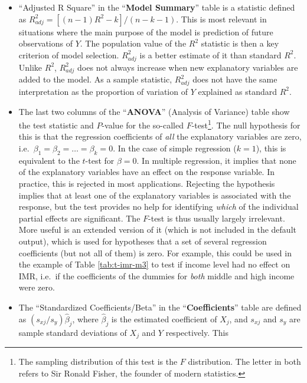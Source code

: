 \documentclass[11pt,a4paper,openany]{book}
\let\rmarkdownfootnote\footnote%
\def\footnote{\protect\rmarkdownfootnote}
\begin{document}
\begin{itemize}
\item
  ``Adjusted R Square'' in the ``\textbf{Model Summary}'' table is a
  statistic defined as \(R^{2}_{adj}=[(n-1)R^{2}-k]/(n-k-1)\). This is
  most relevant in situations where the main purpose of the model is
  prediction of future observations of \(Y\). The population value of
  the \(R^{2}\) statistic is then a key criterion of model selection.
  \(R^{2}_{adj}\) is a better estimate of it than standard \(R^{2}\).
  Unlike \(R^{2}\), \(R^{2}_{adj}\) does not always increase when new
  explanatory variables are added to the model. As a sample statistic,
  \(R^{2}_{adj}\) does not have the same interpretation as the
  proportion of variation of \(Y\) explained as standard \(R^{2}\).
\item
  The last two columns of the ``\textbf{ANOVA}'' (Analysis of Variance)
  table show the test statistic and \(P\)-value for the so-called
  \(F\)-test\footnote{The sampling distribution of this test is the
    \(F\) distribution. The letter in both refers to Sir Ronald Fisher,
    the founder of modern statistics.}. The null hypothesis for this is
  that the regression coefficients of \emph{all} the explanatory
  variables are zero, i.e.~\(\beta_{1}=\beta_{2}=\dots=\beta_{k}=0\). In
  the case of simple regression (\(k=1\)), this is equivalent to the
  \(t\)-test for \(\beta=0\). In multiple regression, it implies that
  none of the explanatory variables have an effect on the response
  variable. In practice, this is rejected in most applications.
  Rejecting the hypothesis implies that at least one of the explanatory
  variables is associated with the response, but the test provides no
  help for identifying \emph{which} of the individual partial effects
  are significant. The \(F\)-test is thus usually largely irrelevant.
  More useful is an extended version of it (which is not included in the
  default output), which is used for hypotheses that a set of several
  regression coefficients (but not all of them) is zero. For example,
  this could be used in the example of Table \ref{tab:t-imr-m3} to test
  if income level had no effect on IMR, i.e.~if the coefficients of the
  dummies for \emph{both} middle and high income were zero.
\item
  The ``Standardized Coefficients/Beta'' in the
  ``\textbf{Coefficients}'' table are defined as
  \((s_{xj}/s_{y})\hat{\beta}_{j}\), where \(\hat{\beta}_{j}\) is the
  estimated coefficient of \(X_{j}\), and \(s_{xj}\) and \(s_{y}\) are
  sample standard deviations of \(X_{j}\) and \(Y\) respectively. This

\end{itemize}
\end{document}
